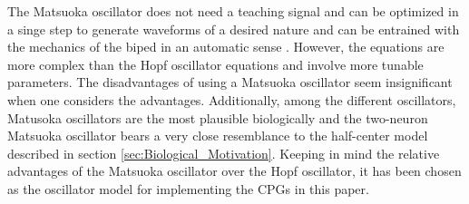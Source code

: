 \documentclass[12pt,twoside]{article}
\theoremstyle{plain}
\theoremstyle{definition}
\theoremstyle{remark}
\newcommand{\forceindent}{\leavevmode{\parindent=2em\indent}}
\begin{document}
\forceindent The Matsuoka oscillator does not need a teaching signal and can be optimized in a singe step to generate waveforms of a desired nature and can be entrained with the mechanics of the biped in an automatic sense \cite{Kieboom2009}. However, the equations are more complex than the Hopf oscillator equations and involve more tunable parameters. The disadvantages of using a Matsuoka oscillator seem insignificant when one considers the advantages. Additionally, among the different oscillators, Matusoka oscillators are the most plausible biologically and the two-neuron Matsuoka oscillator \cite{Matsuoka1987} bears a very close resemblance to the half-center model described in section \ref{sec:Biological_Motivation}. Keeping in mind the relative advantages of the Matsuoka oscillator over the Hopf oscillator, it has been chosen as the oscillator model for implementing the CPGs in this paper.
\end{document}
